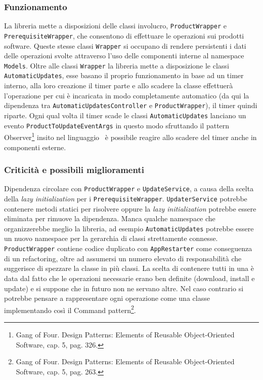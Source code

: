 \documentclass[../RelazioneFinale.tex]{subfiles}
\begin{document}
				
			
			\subsubsection{Funzionamento}
				La libreria mette a disposizioni delle classi involucro, \verb|ProductWrapper| e \verb|PrerequisiteWrapper|, che consentono di effettuare le operazioni sui prodotti software.
				Queste stesse classi \verb|Wrapper| si occupano di rendere persistenti i dati delle operazioni svolte attraverso l'uso delle componenti interne al namespace \verb|Models|.
				Oltre alle classi \verb|Wrapper| la libreria mette a disposizione le classi \verb|AutomaticUpdates|, esse basano il proprio funzionamento in base ad un timer interno, alla loro creazione il timer parte e allo scadere la classe effettuerà l'operazione per cui è incaricata in modo completamente automatico (da qui la dipendenza tra \verb|AutomaticUpdatesController| e \verb|ProductWrapper|), il timer quindi riparte. Ogni qual volta il timer scade le classi \verb|AutomaticUpdates| lanciano un evento \verb|ProductToUpdateEventArgs| in questo modo sfruttando il pattern Observer\footnote{\cite{gamma1994design} Gang of Four. Design Patterns: Elements of Reusable Object-Oriented Software, cap. 5, pag. 326.} insito nel linguaggio \Csharp\ è possibile reagire allo scadere del timer anche in componenti esterne.
			
			\subsubsection{Criticità e possibili miglioramenti}
				Dipendenza circolare con \verb|ProductWrapper| e \verb|UpdateService|, a causa della scelta della \emph{lazy initialization} per i \verb|PrerequisiteWrapper|.
				\verb|UpdaterService| potrebbe contenere metodi statici per risolvere oppure la \emph{lazy initialization} potrebbe essere eliminata per rimuove la dipendenza.
				Manca qualche namespace che organizzerebbe meglio la libreria, ad esempio \verb|AutomaticUpdates| potrebbe essere un nuovo namespace per la gerarchia di classi strettamente connesse.
				\verb|ProductWrapper| contiene codice duplicato con \verb|AppRestarter| come conseguenza di un refactoring, oltre ad assumersi un numero elevato di responsabilità che suggerisce di spezzare la classe in più classi. La scelta di contenere tutti in una è data dal fatto che le operazioni necessarie erano ben definite (download, install e update) e si suppone che in futuro non ne servano altre. Nel caso contrario si potrebbe pensare a rappresentare ogni operazione come una classe implementando così il Command pattern\footnote{\cite{gamma1994design} Gang of Four. Design Patterns: Elements of Reusable Object-Oriented Software, cap. 5, pag. 263.}.
				
\end{document}

